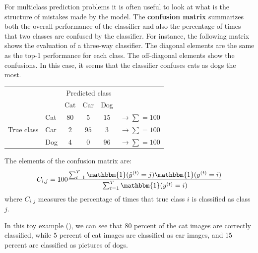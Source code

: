 For multiclass prediction problems it is often useful to look at what is the structure of mistakes made by the model. The {\bf confusion matrix} summarizes both the overall performance of the classifier and also the percentage of times that two classes are confused by the classifier. For instance, the following matrix shows the evaluation of a three-way classifier. The diagonal elements are the same as the top-1 performance for each class. The off-diagonal elements show the confusions. In this case, it seems that the classifier confuses cats as dogs the most. 
\begin{table}[h]
\faketablecaption{} 
\label{table:confusion_matrix}
\begin{center}
\begin{tabular}{l|l|c|c|c|c}
\multicolumn{2}{c}{}&\multicolumn{3}{c}{Predicted class}&\\
\cline{3-5}
\multicolumn{2}{c|}{}&Cat&Car&Dog&\multicolumn{1}{c}{}\\
\cline{2-5}
& Cat & $80$ & $5$ & $15$ & $\rightarrow \sum = 100$\\
\cline{2-5}
True class & Car & $2$ & $95$ & $3$ & $\rightarrow \sum = 100$\\
\cline{2-5}
& Dog & $4$ & $0$ & $96$ & $\rightarrow \sum = 100$\\
\cline{2-5}
\end{tabular}
\end{center}
\end{table}
The elements of the confusion matrix are:
\begin{equation}
    C_{i,j} = 100 \frac{
    \sum_{t=1}^T \mathbbm{1}( \hat{y}^{(t)} = j)  \mathbbm{1} (y^{(t)} = i)
    }{
    \sum_{t=1}^T \mathbbm{1}(y^{(t)} = i) 
    }
\end{equation}
where $C_{i,j}$ measures the percentage of times that true class $i$ is classified as class $j$. 

In this toy example (\tab{\ref{table:confusion_matrix}}), we can see that 80 percent of the cat images are correctly classified, while 5 percent of cat images are classified as car images, and 15 percent are classified as pictures of dogs.



